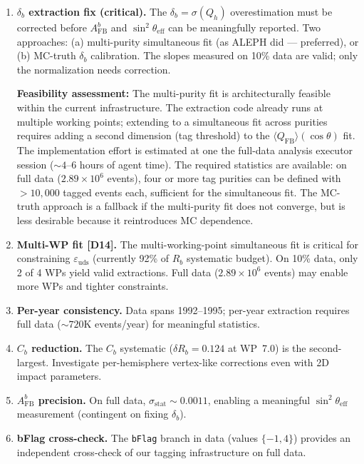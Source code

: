 \documentclass[11pt,a4paper]{article}
\begin{document}
\begin{enumerate}
\item \textbf{$\delta_b$ extraction fix (critical).} The $\delta_b = \sigma(Q_h)$
overestimation must be corrected before $A_\mathrm{FB}^b$ and
$\sin^2\theta_\mathrm{eff}$ can be meaningfully reported. Two approaches:
(a) multi-purity simultaneous fit (as ALEPH did --- preferred), or
(b) MC-truth $\delta_b$ calibration. The slopes measured on 10\% data are valid;
only the normalization needs correction.

\textbf{Feasibility assessment:} The multi-purity fit is architecturally feasible
within the current infrastructure. The extraction code already runs at multiple
working points; extending to a simultaneous fit across purities requires adding a
second dimension (tag threshold) to the $\langle Q_\mathrm{FB} \rangle(\cos\theta)$
fit. The implementation effort is estimated at one the full-data analysis executor session
($\sim 4$--6 hours of agent time). The required statistics are available: on full
data ($2.89 \times 10^6$ events), four or more tag purities can be defined with
$> 10{,}000$ tagged events each, sufficient for the simultaneous fit. The MC-truth
approach is a fallback if the multi-purity fit does not converge, but is less
desirable because it reintroduces MC dependence.

\item \textbf{Multi-WP fit [D14].} The multi-working-point simultaneous fit is
critical for constraining $\varepsilon_\mathrm{uds}$ (currently 92\% of $R_b$
systematic budget). On 10\% data, only 2 of 4 WPs yield valid extractions.
Full data ($2.89 \times 10^6$ events) may enable more WPs and tighter constraints.

\item \textbf{Per-year consistency.} Data spans 1992--1995; per-year extraction
requires full data ($\sim 720$K events/year) for meaningful statistics.

\item \textbf{$C_b$ reduction.} The $C_b$ systematic ($\delta R_b = 0.124$ at WP~7.0)
is the second-largest. Investigate per-hemisphere vertex-like corrections even
with 2D impact parameters.

\item \textbf{$A_\mathrm{FB}^b$ precision.} On full data,
$\sigma_\mathrm{stat} \sim 0.0011$, enabling a meaningful
$\sin^2\theta_\mathrm{eff}$ measurement (contingent on fixing $\delta_b$).

\item \textbf{bFlag cross-check.} The \texttt{bFlag} branch in data (values $\{-1, 4\}$)
provides an independent cross-check of our tagging infrastructure on full data.
\end{enumerate}
\end{document}
